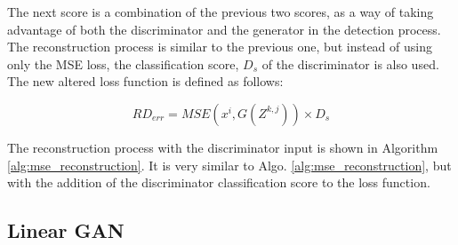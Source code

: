 The next score is a combination of the previous two scores, as a way of taking advantage of both the discriminator and the generator in the detection process. The reconstruction process is similar to the previous one, but instead of using only the MSE loss, the classification score, $D_{s}$ of the discriminator is also used. The new altered loss function is defined as follows:

\begin{equation}
    RD_{err} = MSE(x^i, G(Z^{k,j})) \times D_{s}
\end{equation}

The reconstruction process with the discriminator input is shown in Algorithm \ref{alg:mse_reconstruction}. It is very similar to Algo. \ref{alg:mse_reconstruction}, but with the addition of the discriminator classification score to the loss function.
\\

\noindent{}

\subsection{Linear GAN}\label{sec:linear_gan}

